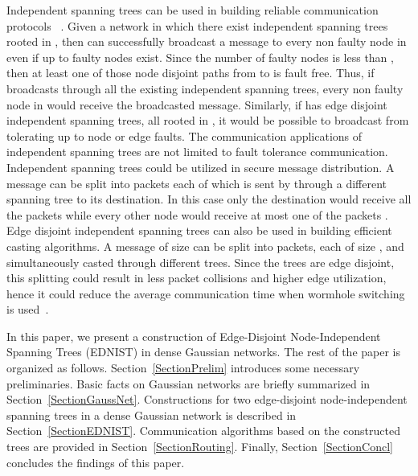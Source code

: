 \documentclass[12pt,journal,compsoc,onecolumn,]{IEEEtran}
\begin{document}
Independent spanning trees can be used in building reliable communication
protocols~\cite{Bao19983}\cite{Chang2015489}\cite{6747363}\cite{DBLP:journals/tc/FragopoulouA96}
\cite{ITAI198843}\cite{Kong:2006:BRM:2692151.2692155}\cite{Touzene:2002:EST:636533.636538}
\cite{DBLP:journals/jpdc/TouzeneDM05}\cite{Tseng96efficientbroadcasting}\cite{DBLP:journals/jpdc/WangB01}
\cite{Yang01012014}\cite{6948321}\cite{10.1007/s11227-014-1346-z}.
Given a network  in which there exist  independent spanning
trees rooted in , then  can successfully broadcast a message to every
non faulty node  in  even if up to  faulty nodes exist.
Since the number of faulty nodes is less than , then at least one of those
 node disjoint paths from  to  is fault free. Thus, if  broadcasts
through all the existing  independent spanning trees, every non faulty node
in  would receive the broadcasted message. Similarly, if
 has  edge disjoint independent spanning trees, all rooted in
, it would be possible to broadcast from  tolerating up to  node or
edge faults. The communication applications of independent spanning trees are
not limited to fault tolerance communication. Independent spanning trees could
be utilized in secure message distribution. A message can be split into 
packets each of which is sent by  through a different spanning tree to its
destination. In this case only the destination would receive all the 
packets while every other node would receive at most one of the  packets
\cite{Lin2010414}\cite{Yang20111254}\cite{Yang:2009:IST:1726593.1728973}. Edge disjoint
independent spanning trees can also be used in building efficient casting
algorithms. A message of size  can be split into  packets, each of size
, and simultaneously casted through different trees. Since the trees are
edge disjoint, this splitting could result in less packet collisions and
higher edge utilization, hence it could reduce the average communication time when
wormhole switching is used~\cite{Alsaleh}\cite{dally2004principles}.


In this paper, we present a construction of Edge-Disjoint Node-Independent Spanning Trees
(EDNIST) in dense Gaussian networks.
The rest of the paper is organized as follows. Section~\ref{SectionPrelim}
introduces some necessary preliminaries. Basic facts on Gaussian networks
are briefly summarized in Section~\ref{SectionGaussNet}.
Constructions for two edge-disjoint node-independent spanning trees in
a dense Gaussian network is described in Section~\ref{SectionEDNIST}.
Communication algorithms based on the constructed trees are provided in
Section~\ref{SectionRouting}. Finally, Section~\ref{SectionConcl} concludes
the findings of this paper.
\end{document}
